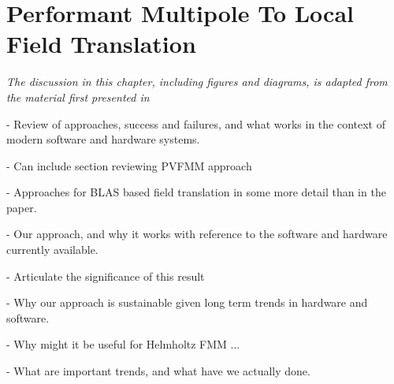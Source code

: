 \chapter{Performant Multipole To Local Field Translation}\label{chpt:field_translation}
\thispagestyle{chaptertitle} %

\begin{center}
    \textit{The discussion in this chapter, including figures and diagrams, is adapted from the material first presented in \cite{kailasa2024m2ltranslationoperatorskernel} }
\end{center}


- Review of approaches, success and failures, and what works in the context of modern software and hardware systems.

- Can include section reviewing PVFMM approach

- Approaches for BLAS based field translation in some more detail than in the paper.

- Our approach, and why it works with reference to the software and hardware currently available.

- Articulate the significance of this result

- Why our approach is sustainable given long term trends in hardware and software.

- Why might it be useful for Helmholtz FMM ...

- What are important trends, and what have we actually done.